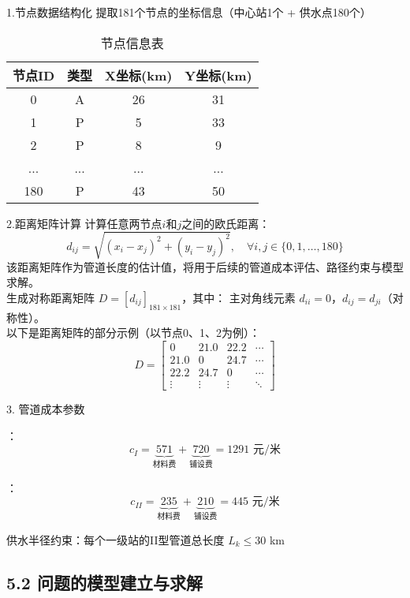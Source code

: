 \documentclass[12pt,a4paper]{article}
\begin{document}
1.节点数据结构化
提取181个节点的坐标信息（中心站1个 + 供水点180个）

\begin{table}[H]
\centering
\caption{节点信息表}

\begin{tabular}{|c|c|c|c|}
\hline
\textbf{节点ID} & \textbf{类型} & \textbf{X坐标(km)} & \textbf{Y坐标(km)} \\
\hline
0   & A & 26 & 31 \\
1   & P & 5  & 33 \\
2   & P & 8  & 9  \\
... & ... & ... & ... \\
180 & P & 43 & 50 \\
\hline
\end{tabular}
\end{table}


2.距离矩阵计算
计算任意两节点$i$和$j$之间的欧氏距离：
$$
  d_{ij} = \sqrt{(x_i - x_j)^2 + (y_i - y_j)^2}, \quad \forall i,j \in \{0,1,\dots,180\}
$$
\indent 该距离矩阵作为管道长度的估计值，将用于后续的管道成本评估、路径约束与模型求解。\\
\indent 生成对称距离矩阵 $D = [d_{ij}]_{181 \times 181}$，其中：
主对角线元素 $d_{ii} = 0$，$d_{ij} = d_{ji}$（对称性）。\\
\indent 以下是距离矩阵的部分示例（以节点0、1、2为例）：
\[
D = \begin{bmatrix}
0 & 21.0 & 22.2 & \cdots \\
21.0 & 0 & 24.7 & \cdots \\
22.2 & 24.7 & 0 & \cdots \\
\vdots & \vdots & \vdots & \ddots
\end{bmatrix}
\]

3. 管道成本参数

：
$$
  c_I = \underbrace{571}_{\text{材料费}} + \underbrace{720}_{\text{铺设费}} = 1291 \text{ 元/米}
$$

：
$$
  c_{II} = \underbrace{235}_{\text{材料费}} + \underbrace{210}_{\text{铺设费}} = 445 \text{ 元/米}
$$

供水半径约束：每个一级站的II型管道总长度 $L_k \leq 30$ km


\subsection*{5.2 问题的模型建立与求解}
\end{document}
